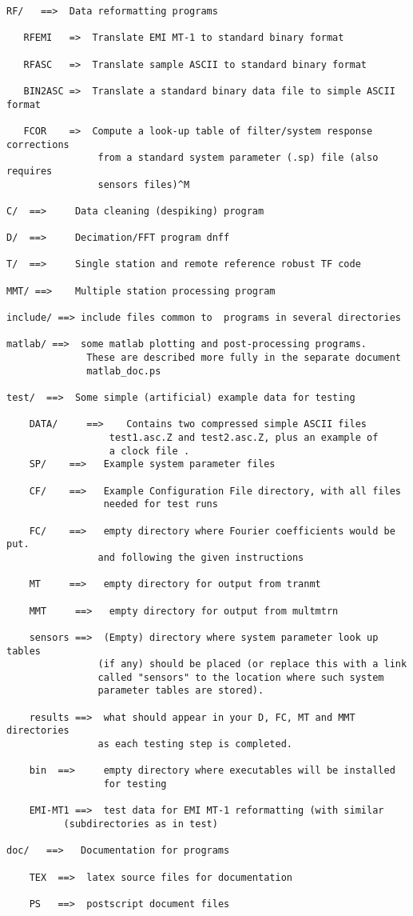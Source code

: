 \small
\begin{verbatim}
RF/   ==>  Data reformatting programs

   RFEMI   =>  Translate EMI MT-1 to standard binary format

   RFASC   =>  Translate sample ASCII to standard binary format

   BIN2ASC =>  Translate a standard binary data file to simple ASCII format

   FCOR    =>  Compute a look-up table of filter/system response corrections
                from a standard system parameter (.sp) file (also requires
                sensors files)^M

C/  ==>     Data cleaning (despiking) program

D/  ==>     Decimation/FFT program dnff

T/  ==>     Single station and remote reference robust TF code

MMT/ ==>    Multiple station processing program

include/ ==> include files common to  programs in several directories

matlab/ ==>  some matlab plotting and post-processing programs.
              These are described more fully in the separate document
              matlab_doc.ps

test/  ==>  Some simple (artificial) example data for testing

    DATA/     ==>    Contains two compressed simple ASCII files
                  test1.asc.Z and test2.asc.Z, plus an example of 
                  a clock file .
    SP/    ==>   Example system parameter files

    CF/    ==>   Example Configuration File directory, with all files
                 needed for test runs

    FC/    ==>   empty directory where Fourier coefficients would be put.
                and following the given instructions

    MT     ==>   empty directory for output from tranmt

    MMT     ==>   empty directory for output from multmtrn

    sensors ==>  (Empty) directory where system parameter look up tables
                (if any) should be placed (or replace this with a link
                called "sensors" to the location where such system
                parameter tables are stored).

    results ==>  what should appear in your D, FC, MT and MMT directories
                as each testing step is completed.

    bin  ==>     empty directory where executables will be installed
                 for testing

    EMI-MT1 ==>  test data for EMI MT-1 reformatting (with similar
		  (subdirectories as in test)

doc/   ==>   Documentation for programs
  
    TEX  ==>  latex source files for documentation

    PS   ==>  postscript document files

\end{verbatim}
\normalsize

